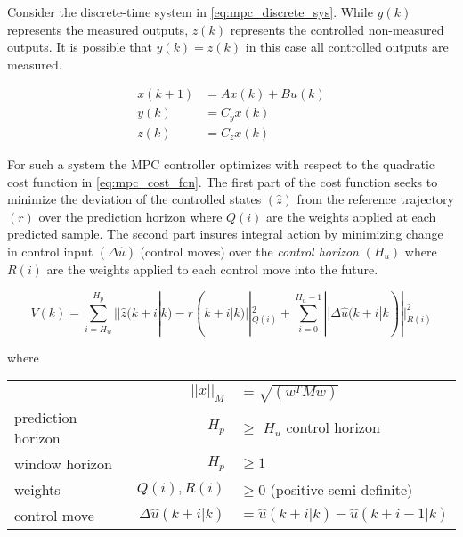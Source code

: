 \medskip

Consider the discrete-time system in \cref{eq:mpc_discrete_sys}. While $y(k)$ represents the measured outputs, $z(k)$ represents the controlled non-measured outputs. It is possible that $y(k) = z(k)$ in this case all controlled outputs are measured.

\begin{equation} \label{eq:mpc_discrete_sys}
	\begin{split}
		x(k+1) 	& = Ax(k) + Bu(k) \\
		y(k) 	& = C_yx(k) \\
		z(k) 	& = C_zx(k)
	\end{split}
\end{equation}

For such a system the MPC controller optimizes with respect to the quadratic cost function in \cref{eq:mpc_cost_fcn}. The first part of the cost function seeks to minimize the deviation of the controlled states $(\hat{z})$ from the reference trajectory $(r)$ over the prediction horizon where $Q(i)$ are the weights applied at each predicted sample. The second part insures integral action by minimizing change in control input $(\Delta \hat{u})$ (control moves) over the \textit{control horizon} $(H_u)$ where $R(i)$ are the weights applied to each control move into the future.

\begin{equation} \label{eq:mpc_cost_fcn}
	V(k) = \sum_{i=H_w}^{H_p}||\hat{z}(k+i|k) - r(k+i|k)||^2_{Q(i)} + \sum_{i=0}^{H_u-1}||\Delta \hat{u}(k+i|k)||^2_{R(i)}
\end{equation}

where

\begin{center}
	\begin{tabular}{l r l }
		                   & $||x||_M$               & $= \sqrt{\left(w^TMw\right)}$         \\
		prediction horizon & $H_p$                   & $\ge$ $H_u$ control horizon           \\
		window horizon     & $H_p$                   & $\ge 1$                               \\
		weights            & $Q(i), R(i)$            & $\ge 0$ (positive semi-definite)      \\
		control move       & $\Delta \hat{u}(k+i|k)$ & $= \hat{u}(k+i|k) - \hat{u}(k+i-1|k)$
	\end{tabular}
\end{center}

